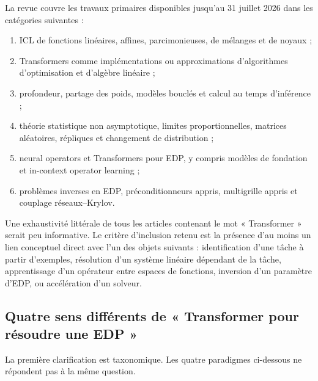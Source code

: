 \documentclass[11pt,a4paper]{article}
\begin{document}
La revue couvre les travaux primaires disponibles jusqu'au 31 juillet 2026
dans les catégories suivantes :
\begin{enumerate}[leftmargin=*]
  \item ICL de fonctions linéaires, affines, parcimonieuses, de mélanges et de
  noyaux ;
  \item Transformers comme implémentations ou approximations d'algorithmes
  d'optimisation et d'algèbre linéaire ;
  \item profondeur, partage des poids, modèles bouclés et calcul au temps
  d'inférence ;
  \item théorie statistique non asymptotique, limites proportionnelles,
  matrices aléatoires, répliques et changement de distribution ;
  \item neural operators et Transformers pour EDP, y compris modèles de
  fondation et in-context operator learning ;
  \item problèmes inverses en EDP, préconditionneurs appris, multigrille appris
  et couplage réseaux--Krylov.
\end{enumerate}

Une exhaustivité littérale de tous les articles contenant le mot
« Transformer » serait peu informative. Le critère d'inclusion retenu est la
présence d'au moins un lien conceptuel direct avec l'un des objets suivants :
identification d'une tâche à partir d'exemples, résolution d'un système
linéaire dépendant de la tâche, apprentissage d'un opérateur entre espaces de
fonctions, inversion d'un paramètre d'EDP, ou accélération d'un solveur.

\subsection{Quatre sens différents de « Transformer pour résoudre une EDP »}

La première clarification est taxonomique. Les quatre paradigmes ci-dessous
ne répondent pas à la même question.
\end{document}
